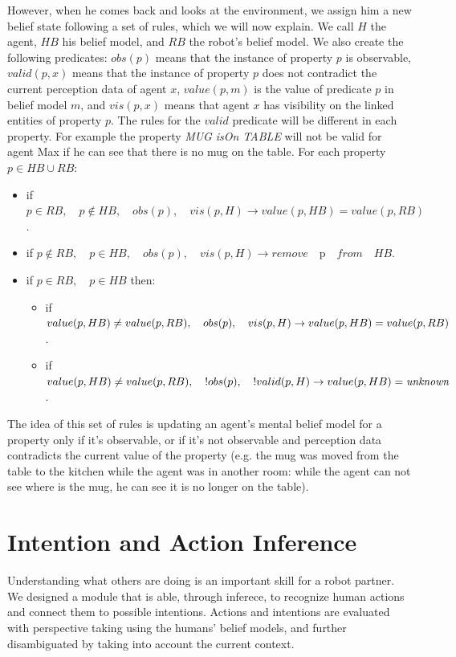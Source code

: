 However, when he comes back and looks at the environment, we assign him a new belief state following a set of rules, which we will now explain. We call $H$ the agent, $HB$ his belief model, and $RB$ the robot's belief model. We also create the following predicates: $obs(p)$ means that the instance of property $p$ is observable, $valid(p,x)$ means that the instance of property $p$ does not contradict the current perception data of agent $x$, $value(p,m)$ is the value of predicate $p$ in belief model $m$, and $vis(p,x)$ means that agent $x$ has visibility on the linked entities of property $p$. The rules for the $valid$ predicate will be different in each property. For example the property \textit{MUG isOn TABLE} will not be valid for agent Max if he can see that there is no mug on the table. For each property $p\in HB \cup RB$:
\begin{itemize}
\item if $p \in RB, \quad p\not\in HB,\quad obs(p),\quad vis(p,H) \rightarrow value(p,HB)=value(p,RB)$.
\item if $p \not \in RB,\quad p\in HB,\quad obs(p),\quad vis(p,H) \rightarrow remove\quad $p$ \quad from \quad HB$.
\item if $p\in RB,\quad p\in HB$ then:
	\begin{itemize}
      \item if $value(p,HB)\neq value(p,RB),\\ \quad obs(p),\quad vis(p,H) \rightarrow \\ value(p,HB)=value(p,RB)$.
      \item if $value(p,HB)\neq value(p,RB),\\ \quad !obs(p),\quad !valid(p,H) \rightarrow \\ value(p,HB)=\textit{unknown}$.
	\end{itemize}
\end{itemize}
The idea of this set of rules is updating an agent's mental belief model for a property only if it's observable, or if it's not observable and perception data contradicts the current value of the property (e.g. the mug was moved from the table to the kitchen while the agent was in another room: while the agent can not see where is the mug, he can see it is no longer on the table).



\section{Intention and Action Inference}
\label{sec:situation_assessment-intention_recognition}
Understanding what others are doing is an important skill for a robot partner. We designed a module that is able, through inferece, to recognize human actions and connect them to possible intentions. Actions and intentions are evaluated with perspective taking using the humans' belief models, and further disambiguated by taking into account the current context.

